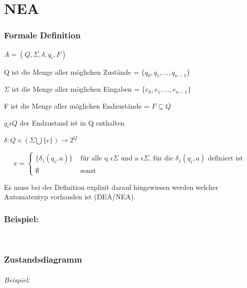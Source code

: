 \part{NEA}

\section{Formale Definition}

$A=(Q,\Sigma,\delta,q_{i},F)$

Q ist die Menge aller möglichen Zustände = $\{q_0,q_1,...,q_{n-1}\}$

$\Sigma$ ist die Menge aller möglichen Eingaben = $\{e_0,e_{1},...,e_{n-1}\}$

F ist die Menge aller möglichen Endzustände = $F\subseteq Q$

$q_{i}\epsilon Q$ der Endzustand ist in Q enthalten

$\delta:Q \times (\Sigma \bigcup \{\epsilon\}) \rightarrow 2^Q$


\[
 x =
  \begin{cases}
   \{\delta_1(q_i,a)\} & \text{ für alle q } \epsilon \Sigma \text{ und a } \epsilon \Sigma \text{, für die } \delta_1(q_i,a) \text{ definiert ist} \\
	\emptyset & \text{ sonst}
  \end{cases}
\]

Es muss bei der Definition explizit darauf hingewiesen werden welcher Automatentyp vorhanden ist (DEA/NEA).

\section*{Beispiel:}\mbox{} \\


\section{Zustandsdiagramm}

\paragraph{Beispiel:}\mbox{} \\

